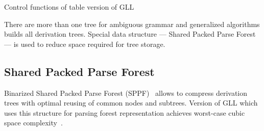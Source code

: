 \begin{algorithm}[h]
\begin{algorithmic}[1]
\caption{Control functions of table version of GLL}
\label{mainTblFunctions}
  \Else
  \EndIf
\EndFunction

       \Else 
       \EndIf
       \EndIf
  \EndCase
       \EndFor
  \EndCase
  \EndCase
  \EndCase
  \EndSwitch
\EndFunction

      \Else
      \EndIf
  \EndWhile
\EndFunction

\end{algorithmic}
\end{algorithm}

There are more than one tree for ambiguous grammar and generalized algorithms builds all derivation trees. Special data structure --- Shared Packed Parse Forest~\cite{SPPF} --- is used to reduce space required for tree storage.


\subsection{Shared Packed Parse Forest}

Binarized Shared Packed Parse Forest (SPPF)~\cite{brnglr} allows to compress derivation trees with optimal reusing of common nodes and subtrees.
Version of GLL which uses this structure for parsing forest representation achieves worst-case cubic space complexity~\cite{gllParsingTree}.

